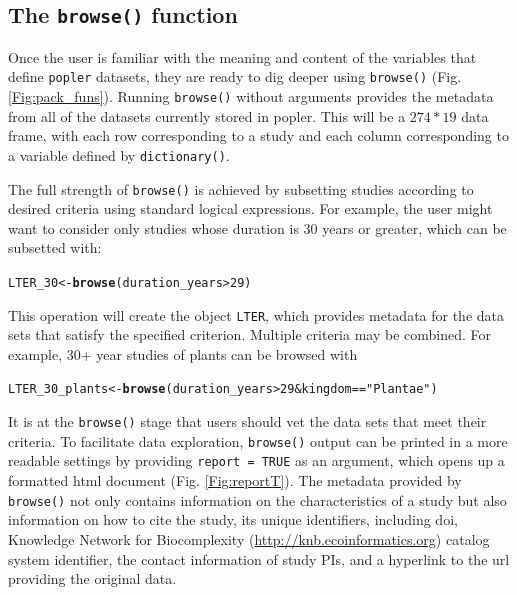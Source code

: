 \documentclass{article}\usepackage[]{graphicx}\usepackage[]{color}
\makeatletter
\newcommand{\hlnum}[1]{\textcolor[rgb]{0.686,0.059,0.569}{#1}}%
\newcommand{\hlstr}[1]{\textcolor[rgb]{0.192,0.494,0.8}{#1}}%
\newcommand{\hlopt}[1]{\textcolor[rgb]{0,0,0}{#1}}%
\newcommand{\hlstd}[1]{\textcolor[rgb]{0.345,0.345,0.345}{#1}}%
\newcommand{\hlkwb}[1]{\textcolor[rgb]{0.69,0.353,0.396}{#1}}%
\newcommand{\hlkwd}[1]{\textcolor[rgb]{0.737,0.353,0.396}{\textbf{#1}}}%
\newenvironment{kframe}{%
 \def\at@end@of@kframe{}%
 \ifinner\ifhmode%
  \def\at@end@of@kframe{\end{minipage}}%
  \begin{minipage}{\columnwidth}%
 \fi\fi%
 \def\FrameCommand##1{\hskip\@totalleftmargin \hskip-\fboxsep
 \colorbox{shadecolor}{##1}\hskip-\fboxsep
     \hskip-\linewidth \hskip-\@totalleftmargin \hskip\columnwidth}%
 \MakeFramed {\advance\hsize-\width
   \@totalleftmargin\z@ \linewidth\hsize
   \@setminipage}}%
 {\par\unskip\endMakeFramed%
 \at@end@of@kframe}
\newenvironment{knitrout}{}{} %
\makeatother
\begin{document}
\subsection*{The \texttt{browse()} function}
Once the user is familiar with the meaning and content of the variables that define \texttt{popler} datasets, they are ready to dig deeper using \texttt{browse()} (Fig. \ref{Fig:pack_funs}). Running \texttt{browse()} without arguments provides the metadata from all of the datasets currently stored in popler. This will be a $274 * 19$ data frame, with each row corresponding to a study and each column corresponding to a variable defined by \texttt{dictionary()}.

The full strength of \texttt{browse()} is achieved by subsetting studies according to desired criteria using standard logical expressions. For example, the user might want to consider only studies whose duration is 30 years or greater, which can be subsetted with:
\begin{knitrout}
\color{fgcolor}\begin{kframe}
\begin{alltt}
\hlstd{LTER_30} \hlkwb{<-} \hlkwd{browse}\hlstd{( duration_years} \hlopt{>} \hlnum{29}\hlstd{)}
\end{alltt}
\end{kframe}
\end{knitrout}
This operation will create the object \texttt{LTER}, which provides metadata for the data sets that satisfy the specified criterion. Multiple criteria may be combined. For example, 30+ year studies of plants can be browsed with
\begin{knitrout}
\color{fgcolor}\begin{kframe}
\begin{alltt}
\hlstd{LTER_30_plants} \hlkwb{<-} \hlkwd{browse}\hlstd{( duration_years} \hlopt{>} \hlnum{29} \hlopt{&} \hlstd{kingdom} \hlopt{==} \hlstr{"Plantae"}\hlstd{)}
\end{alltt}
\end{kframe}
\end{knitrout}
It is at the \texttt{browse()} stage that users should  vet the data sets that meet their criteria. To facilitate data exploration, \texttt{browse()} output can be printed in a more readable settings by providing \texttt{report = TRUE} as an argument, which opens up a formatted html document (Fig. \ref{Fig:reportT}). The metadata provided by \texttt{browse()} not only contains information on the characteristics of a study but also information on how to cite the study, its unique identifiers, including doi, Knowledge Network for Biocomplexity (\url{http://knb.ecoinformatics.org}) catalog system identifier, the contact information of study PIs, and a hyperlink to the url providing the original data.
\end{document}
